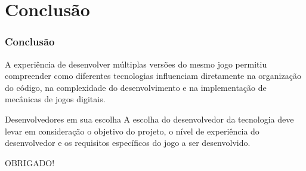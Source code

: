 \section{Conclusão}


\begin{frame}

    \frametitle{Conclusão}

    A experiência de desenvolver múltiplas versões do mesmo jogo permitiu compreender como diferentes tecnologias influenciam diretamente na organização do código, na complexidade do desenvolvimento e na implementação de mecânicas de jogos digitais.
    
    \begin{exampleblock}{Desenvolvedores em sua escolha}
    	A escolha do desenvolvedor da tecnologia deve levar em consideração o objetivo do projeto, o nível de experiência do desenvolvedor e os requisitos específicos do jogo a ser desenvolvido.
    \end{exampleblock}
    
    

\end{frame}

\begin{frame}
    \begin{center}
        \Huge{OBRIGADO!}
    \end{center}
\end{frame}